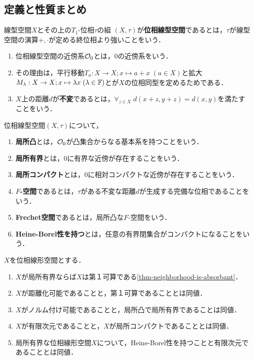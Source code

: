 \documentclass[uplatex,dvipdfmx]{jsreport}
\begin{document}
\subsection{定義と性質まとめ}

\begin{definition}
    線型空間$X$とその上の$T_1$-位相$\tau$の組
    $(X,\tau)$が\textbf{位相線型空間}であるとは，$\tau$が線型空間の演算$+,\cdot$が定める終位相より強いことをいう．
    \begin{enumerate}
        \item 位相線型空間の近傍系$\mathcal{O}_0$とは，$0$の近傍系をいう．
        \item その理由は，平行移動$T_a:X\to X;x\mapsto a+x\;(a\in X)$と拡大$M_\lambda:X\to X;x\mapsto\lambda x\;(\lambda\in\mathbb{F})$とが$X$の位相同型を定めるためである．
        \item $X$上の距離$d$が\textbf{不変}であるとは，$\forall_{z\in X}\;d(x+z,y+z)=d(x,y)$を満たすことをいう．
    \end{enumerate}
\end{definition}

\begin{definition}
    位相線型空間$(X,\tau)$について，
    \begin{enumerate}
        \item \textbf{局所凸}とは，$\mathcal{O}_0$が凸集合からなる基本系を持つことをいう．
        \item \textbf{局所有界}とは，$0$に有界な近傍が存在することをいう．
        \item \textbf{局所コンパクト}とは，$0$に相対コンパクトな近傍が存在することをいう．
        \item \textbf{$F$-空間}であるとは，$\tau$がある不変な距離$d$が生成する完備な位相であることをいう．
        \item \textbf{Frechet空間}であるとは，局所凸な$F$-空間をいう．
        \item \textbf{Heine-Borel性を持つ}とは，任意の有界閉集合がコンパクトになることをいう．
    \end{enumerate}
\end{definition}

\begin{theorem}[位相線型空間の性質まとめ]\label{thm-character-of-TVS}
    $X$を位相線形空間とする．
    \begin{enumerate}
        \item $X$が局所有界ならば$X$は第１可算である\ref{thm-neighborhood-is-absorbant}．
        \item $X$が距離化可能であることと，第１可算であることとは同値．
        \item $X$がノルム付け可能であることと，局所凸で局所有界であることは同値．
        \item $X$が有限次元であることと，$X$が局所コンパクトであることとは同値．
        \item 局所有界な位相線形空間$X$について，Heine-Borel性を持つことと有限次元であることとは同値．
    \end{enumerate}
\end{theorem}
\end{document}
